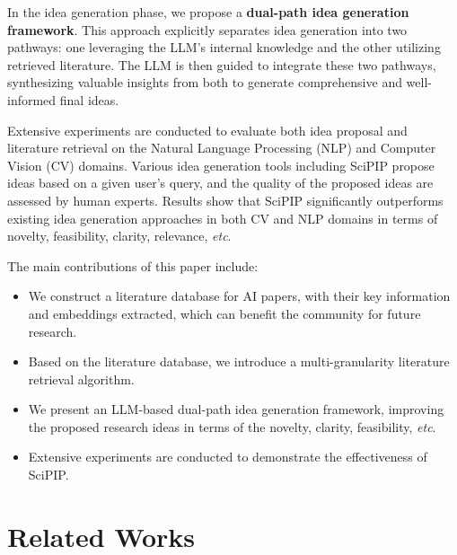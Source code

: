 \documentclass{article}
\theoremstyle{plain}
\theoremstyle{definition}
\theoremstyle{remark}
\newcommand\etc{\textit{etc}}
\begin{document}
In the idea generation phase, we propose a \textbf{dual-path idea generation framework}. This approach explicitly separates idea generation into two pathways: one leveraging the LLM’s internal knowledge and the other utilizing retrieved literature. The LLM is then guided to integrate these two pathways, synthesizing valuable insights from both to generate comprehensive and well-informed final ideas.

Extensive experiments are conducted to evaluate both idea proposal and literature retrieval on the Natural Language Processing (NLP) and Computer Vision (CV) domains. Various idea generation tools including SciPIP propose ideas based on a given user's query, and the quality of the proposed ideas are assessed by human experts. Results show that SciPIP significantly outperforms existing idea generation approaches in both CV and NLP domains in terms of novelty, feasibility, clarity, relevance, \etc.

The main contributions of this paper include:
\vspace{-3mm}
\begin{itemize}
    \item We construct a literature database for AI papers, with their key information and embeddings extracted, which can benefit the community for future research.
    \vspace{-2mm}
    \item Based on the literature database, we introduce a multi-granularity literature retrieval algorithm.
    \vspace{-2mm}
    \item We present an LLM-based dual-path idea generation framework, improving the proposed research ideas in terms of the novelty, clarity, feasibility, \etc.
    \vspace{-2mm}
    \item Extensive experiments are conducted to demonstrate the effectiveness of SciPIP.
\end{itemize}

\section{Related Works}
\end{document}
